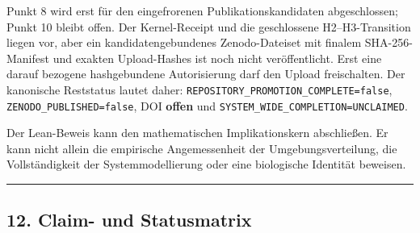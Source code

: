 \documentclass[
  10pt,
  a4paper,
]{article}
\begin{document}
Punkt 8 wird erst für den eingefrorenen Publikationskandidaten
abgeschlossen; Punkt 10 bleibt offen. Der Kernel-Receipt und die
geschlossene H2--H3-Transition liegen vor, aber ein kandidatengebundenes
Zenodo-Dateiset mit finalem SHA-256-Manifest und exakten Upload-Hashes ist
noch nicht veröffentlicht. Erst eine darauf bezogene hashgebundene
Autorisierung darf den Upload freischalten. Der kanonische Reststatus
lautet daher:
\texttt{REPOSITORY\_PROMOTION\_COMPLETE=false},
\texttt{ZENODO\_PUBLISHED=false}, DOI \textbf{offen} und
\texttt{SYSTEM\_WIDE\_COMPLETION=UNCLAIMED}.

Der Lean-Beweis kann den mathematischen Implikationskern abschließen. Er
kann nicht allein die empirische Angemessenheit der Umgebungsverteilung,
die Vollständigkeit der Systemmodellierung oder eine biologische
Identität beweisen.

\begin{center}\rule{0.5\linewidth}{0.5pt}\end{center}

\hypertarget{claim--und-statusmatrix}{%
\subsection{12. Claim- und Statusmatrix}\label{claim--und-statusmatrix}}
\end{document}
